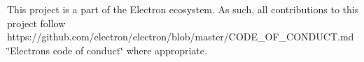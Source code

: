 This project is a part of the Electron ecosystem. As such, all contributions to this project follow https\+://github.com/electron/electron/blob/master/\+C\+O\+D\+E\+\_\+\+O\+F\+\_\+\+C\+O\+N\+D\+U\+C\+T.\+md \char`\"{}\+Electron\textquotesingle{}s code of conduct\char`\"{} where appropriate. 